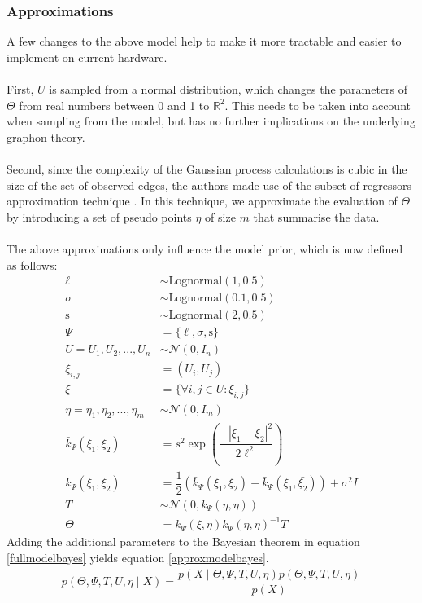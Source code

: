 \documentclass[11pt]{report} %
\begin{document}
\subsubsection{Approximations}
A few changes to the above model help to make it more tractable and easier to implement on current hardware.\\\\
First, $U$ is sampled from a normal distribution, which changes the parameters of $\Theta$ from real numbers between 0 and 1 to $\mathbb{R}^2$. This needs to be taken into account when sampling from the model, but has no further implications on the underlying graphon theory.\\\\
Second, since the complexity of the Gaussian process calculations is cubic in the size of the set of observed edges, the authors made use of the subset of regressors approximation technique \cite{candela2007}. In this technique, we approximate the evaluation of $\Theta$ by introducing a set of pseudo points $\eta$ of size $m$ that summarise the data. \\\\
The above approximations only influence the model prior, which is now defined as follows:
\begin{align}
\ell &\sim \text{Lognormal}(1,0.5)\\
\sigma &\sim \text{Lognormal}(0.1,0.5)\\
\text{s} &\sim \text{Lognormal}(2,0.5)\\
\Psi &= \{\ell, \sigma,\text{s}\}\\
U = U_1,U_2,...,U_n &\sim \mathcal{N}(0,I_n)\\
\xi_{i,j}&=(U_i, U_j)\\
\xi &= \{\forall i, j \in U: \xi_{i,j}\}\\
\eta = \eta_1,\eta_2,...,\eta_m &\sim \mathcal{N}(0,I_m)\\
\bar{k}_\Psi(\xi_1, \xi_2) &= s^2\exp(\dfrac{-|\xi_1-\xi_2|^2}{2\ell^2})\\
k_\Psi(\xi_1, \xi_2) &= \dfrac{1}{2}(\bar{k}_\Psi(\xi_1, \xi_2) + \bar{k}_\Psi(\xi_1, \bar{\xi_2})) + \sigma^2I\\
T &\sim \mathcal{N}(0,k_\Psi(\eta,\eta))\\
\Theta &= k_\Psi(\xi,\eta) k_\Psi(\eta,\eta)^{-1}T
\end{align}
Adding the additional parameters to the Bayesian theorem in equation \ref{fullmodelbayes} yields equation \ref{approxmodelbayes}.
\begin{align}
\label{approxmodelbayes}
p(\Theta,\Psi,T,U,\eta\mid X)=\dfrac{p(X\mid\Theta,\Psi,T,U,\eta)p(\Theta,\Psi, T, U, \eta)}{p(X)}
\end{align}
\end{document}
